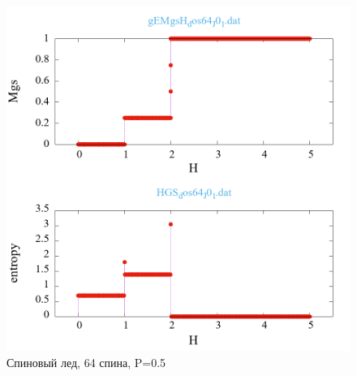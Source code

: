 \documentclass[utf8, babel, sor, jor, amsmath, amssymb, reprint]{elsarticle} %
\begin{document}
\begin{figure}[H]
	\centering
	\includegraphics[width=1\textwidth]{_multiplot_SI64_J0_1.dat.png}
	\caption{Спиновый лед, 64 спина, P=0.5}
	\label{fig:_multiplot_SI64_J0_1.dat.png}
\end{figure}
\end{document}
